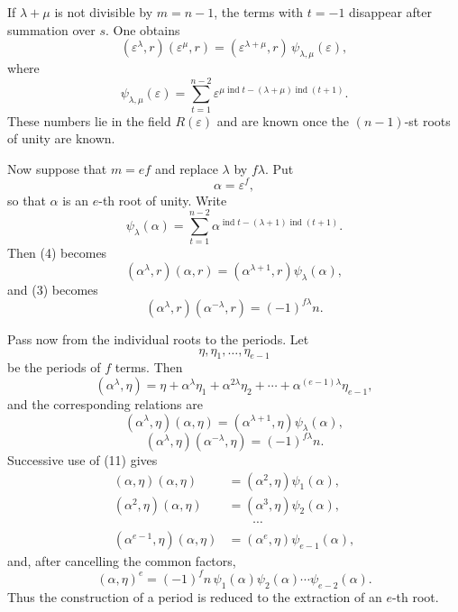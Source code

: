 \documentclass[11pt]{article}
\providecommand{\ind}{\operatorname{ind}}
\begin{document}
If $\lambda+\mu$ is not divisible by $m=n-1$, the terms with $t=-1$ disappear after summation over $s$. One obtains
\[
        (\varepsilon^\lambda,r)(\varepsilon^\mu,r)=
        (\varepsilon^{\lambda+
\mu},r)\,\psi_{\lambda,
\mu}(\varepsilon),              \tag{4}
\]
where
\[
        \psi_{\lambda,
\mu}(\varepsilon)=
        \sum_{t=1}^{n-2}
        \varepsilon^{\mu\ind t-(\lambda+
\mu)\ind(t+1)}.                         \tag{5}
\]
These numbers lie in the field $R(\varepsilon)$ and are known once the $(n-1)$-st roots of unity are known.

Now suppose that $m=ef$ and replace $\lambda$ by $f\lambda$. Put
\[
        \alpha=\varepsilon^f,                                                    \tag{6}
\]
so that $\alpha$ is an $e$-th root of unity. Write
\[
        \psi_\lambda(\alpha)=
        \sum_{t=1}^{n-2}\alpha^{\ind t-(\lambda+1)\ind(t+1)}.                  \tag{7}
\]
Then (4) becomes
\[
        (\alpha^\lambda,r)(\alpha,r)=
        (\alpha^{\lambda+1},r)\psi_\lambda(\alpha),                             \tag{8}
\]
and (3) becomes
\[
        (\alpha^\lambda,r)(\alpha^{-\lambda},r)=(-1)^{f\lambda}n.               \tag{9}
\]

Pass now from the individual roots to the periods. Let
\[
        \eta,
\eta_1,
\ldots,
\eta_{e-1}
\]
be the periods of $f$ terms. Then
\[
        (\alpha^\lambda,
\eta)=
        \eta+
        \alpha^\lambda\eta_1+
        \alpha^{2\lambda}\eta_2+
        \cdots+
        \alpha^{(e-1)\lambda}\eta_{e-1},                                      \tag{10}
\]
and the corresponding relations are
\[
        (\alpha^\lambda,
\eta)(\alpha,
\eta)=
        (\alpha^{\lambda+1},
\eta)\psi_\lambda(\alpha),                         \tag{11}
\]
\[
        (\alpha^\lambda,
\eta)(\alpha^{-\lambda},
\eta)=(-1)^{f\lambda}n.                         \tag{12}
\]
Successive use of (11) gives
\[
\begin{aligned}
(\alpha,
\eta)(\alpha,
\eta)&=(\alpha^2,
\eta)\psi_1(\alpha),\\
(\alpha^2,
\eta)(\alpha,
\eta)&=(\alpha^3,
\eta)\psi_2(\alpha),\\
&\hspace{2em}\cdots\\
(\alpha^{e-1},
\eta)(\alpha,
\eta)&=(\alpha^e,
\eta)\psi_{e-1}(\alpha),
\end{aligned}
\]
and, after cancelling the common factors,
\[
        (\alpha,
\eta)^e=(-1)^f n\,\psi_1(\alpha)
        \psi_2(\alpha)\cdots\psi_{e-2}(\alpha).                         \tag{13}
\]
Thus the construction of a period is reduced to the extraction of an $e$-th root.
\end{document}
